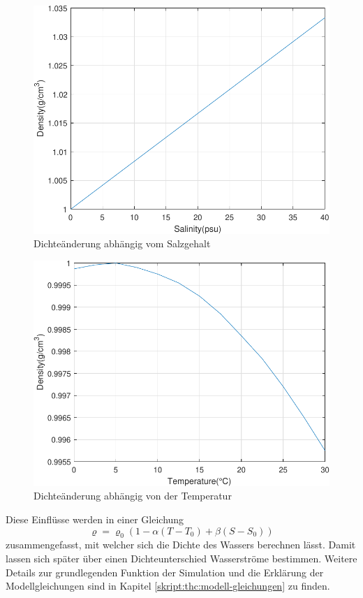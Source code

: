 \begin{figure}
	\centering
\includegraphics[width=12cm]{thermohalin/Code/graphs/graph_salinity.pdf}
\caption{Dichteänderung abhängig vom Salzgehalt\label{thermohalin:graph-salinity}}
\end{figure}
\begin{figure}
	\centering
	\includegraphics[width=12cm]{thermohalin/Code/graphs/graph_temp.pdf}
	\caption{Dichteänderung abhängig von der Temperatur\label{thermohalin:graph-temp}}
\end{figure}

Diese Einflüsse werden in einer Gleichung  
 \begin{equation}
 \varrho
 =
 \varrho_0(1-\alpha(T-T_0)+\beta(S-S_0))
 \label{thermohalin:Dichte}
 \end{equation} 
zusammengefasst, mit welcher sich die Dichte des Wassers berechnen lässt.
Damit lassen sich später über einen Dichteunterschied Wasserströme bestimmen.
Weitere Details zur grundlegenden Funktion der Simulation und die Erklärung der Modellgleichungen sind in Kapitel \ref{skript:thc:modell-gleichungen} zu finden.


